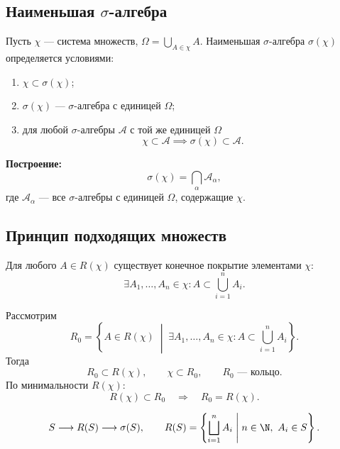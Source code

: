 \subsection{Наименьшая \texorpdfstring{$\sigma$}{σ}-алгебра}

\begin{definition}
    Пусть $\chi$ --- система множеств,
    $\Omega = \bigcup_{A\in\chi} A$.
    Наименьшая $\sigma$-алгебра $\sigma(\chi)$ определяется условиями:
    \begin{enumerate}[label=\arabic*)]
        \item $\chi \subset \sigma(\chi)$;
        \item $\sigma(\chi)$ --- $\sigma$-алгебра с единицей $\Omega$;
        \item для любой $\sigma$-алгебры $\mathcal{A}$
        с той же единицей $\Omega$
        \[
            \chi \subset \mathcal{A}
            \implies \sigma(\chi) \subset \mathcal{A}.
        \]
    \end{enumerate}
\end{definition}

\textbf{Построение:}
\[
    \sigma(\chi) = \bigcap_{\alpha} \mathcal{A}_\alpha,
\]
где $\mathcal{A}_\alpha$ --- все $\sigma$-алгебры
с единицей $\Omega$, содержащие $\chi$.

\subsection{Принцип подходящих множеств}

\begin{task}
    Для любого $A\in R(\chi)$ существует конечное покрытие
    элементами $\chi$:
    \[
        \exists A_1,\ldots,A_n\in\chi\colon
        A\subset\bigcup_{i=1}^{n} A_i.
    \]
\end{task}

\begin{solution}
    Рассмотрим
    \[
        R_0 = \left\{A\in R(\chi)\;\middle|\;
        \exists A_1,\ldots,A_n\in\chi\colon
        A\subset\bigcup_{i=1}^{n} A_i\right\}.
    \]
    Тогда
    \[
        R_0\subset R(\chi),\qquad
        \chi\subset R_0,\qquad R_0\text{ --- кольцо}.
    \]
    По минимальности $R(\chi)$:
    \[
        R(\chi)\subset R_0
        \quad\Longrightarrow\quad R_0=R(\chi).
    \]
\end{solution}

\[
    S\longrightarrow R(S)\longrightarrow\sigma(S),
    \qquad
    R(S)=\left\{\bigsqcup_{i=1}^{n}A_i\;\middle|\;
    n\in\N,\ A_i\in S\right\}.
\]

